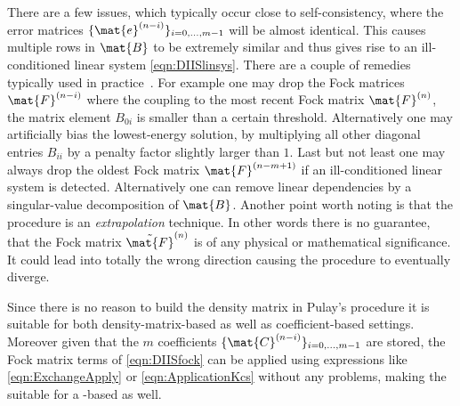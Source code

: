 There are a few issues,
which typically occur close to self-consistency,
where the error matrices $\{\mat{e}^{(n-i)}\}_{i=0,\ldots,m-1}$
will be almost identical.
This causes multiple rows in $\mat{B}$ to be extremely similar
and thus gives rise to an ill-conditioned linear system \eqref{eqn:DIISlinsys}.
There are a couple of remedies typically used in practice~\cite{Kudin2002}.
For example one may drop the Fock matrices $\mat{F}^{(n-i)}$
where the coupling to the most recent Fock matrix $\mat{F}^{(n)}$,
\ie the matrix element $B_{0i}$ is smaller than a certain threshold.
Alternatively one may artificially bias the lowest-energy solution,
by multiplying all other diagonal entries $B_{ii}$ by a penalty
factor slightly larger than $1$.
Last but not least one may always drop the oldest Fock matrix
$\mat{F}^{(n-m+1)}$ if an ill-conditioned linear system is detected.
Alternatively one can remove linear dependencies by a singular-value
decomposition of $\mat{B}$.
Another point worth noting is that the \DIIS procedure is an \emph{extrapolation}
technique.
In other words there is no guarantee,
that the Fock matrix $\tilde{\mat{F}}^{(n)}$ is of any physical
or mathematical significance.
It could lead into totally the wrong direction causing the \SCF
procedure to eventually diverge.

Since there is no reason to build the density matrix
in Pulay's \DIIS procedure
it is suitable for both density-matrix-based as well as coefficient-based \SCF settings.
Moreover given that the $m$ coefficients $\{ \mat{C}^{(n-i)} \}_{i=0,\ldots,m-1}$
are stored,
the Fock matrix terms of \eqref{eqn:DIISfock}
can be applied using expressions like \eqref{eqn:ExchangeApply}
or \eqref{eqn:ApplicationKcs} without any problems,
making the \DIIS suitable for a \contraction-based \SCF as well.

